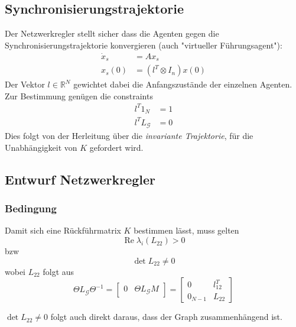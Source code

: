 
\subsection{Synchronisierungstrajektorie}
Der Netzwerkregler stellt sicher dass die Agenten gegen die Synchronisierungstrajektorie
konvergieren (auch "virtueller Führungsagent"):
\begin{align}
    \dot{x}_s &= Ax_s \\
    x_s(0) &= (l^T \otimes I_n) x(0)
\end{align}
Der Vektor $l \in \mathbb{R}^N$ gewichtet dabei die Anfangszustände der einzelnen
Agenten.
Zur Bestimmung genügen die constraints 
\begin{align}
    l^T 1_N &= 1 \\
    l^T L_\mathcal{G} &= 0
\end{align}
Dies folgt von der Herleitung über die \emph{invariante Trajektorie}, für die
Unabhängigkeit von $K$ gefordert wird.

\subsection{Entwurf Netzwerkregler}

\subsubsection{Bedingung}
Damit sich eine Rückführmatrix $K$ bestimmen lässt, muss gelten
\begin{equation}
    \operatorname{Re} \lambda_i(L_{22}) > 0
\end{equation}
bzw
\begin{equation}
    \det L_{22} \neq 0
\end{equation}
wobei $L_{22}$ folgt aus
\begin{equation}
    \Theta L_\mathcal{G} \Theta^{-1} = \begin{bmatrix}
        0 & \Theta L_\mathcal{G}M
    \end{bmatrix}
    = \begin{bmatrix}
        0 & l_{12}^T \\
        0_{N-1} & L_{22}
    \end{bmatrix}
\end{equation}

$\det L_{22} \neq 0$ folgt auch direkt daraus, dass der Graph zusammenhängend ist.

